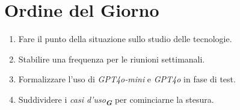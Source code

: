 
\section{Ordine del Giorno}

\begin{enumerate}
    \item Fare il punto della situazione sullo studio delle tecnologie.
    \item Stabilire una frequenza per le riunioni settimanali.
    \item Formalizzare l'uso di \emph{GPT4o-mini} e \emph{GPT4o} in fase di test.
    \item Suddividere i \emph{casi d'uso}\textsubscript{\textbf{\textit{G}}} per cominciarne la stesura.
\end{enumerate}
